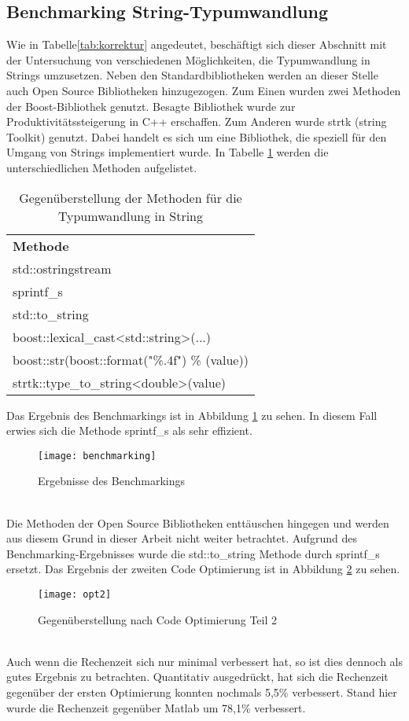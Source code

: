 \subsection{Benchmarking String-Typumwandlung}
Wie in Tabelle\ref{tab:korrektur} angedeutet, beschäftigt sich dieser Abschnitt mit der Untersuchung von verschiedenen Möglichkeiten, die Typumwandlung in Strings umzusetzen. Neben den Standardbibliotheken werden an dieser Stelle auch Open Source Bibliotheken hinzugezogen. Zum Einen wurden zwei Methoden der Boost-Bibliothek genutzt. Besagte Bibliothek wurde zur Produktivitätssteigerung in C++ erschaffen. Zum Anderen wurde strtk (string Toolkit) genutzt. Dabei handelt es sich um eine Bibliothek, die speziell für den Umgang von Strings implementiert wurde. In Tabelle \ref{tab:benchmarking} werden die unterschiedlichen Methoden aufgelistet. 
\begin{table}[h]
	\centering\begin{tabular}{l}
		\textbf{Methode}  \\
			std::ostringstream \\
			sprintf\_s \\
			std::to\_string\\
			boost::lexical\_cast<std::string>(...)\\
			boost::str(boost::format("\%.4f") \% (value))\\
			strtk::type\_to\_string<double>(value)
			\end{tabular}
	\caption{Gegenüberstellung der Methoden für die Typumwandlung in String}
\label{tab:benchmarking}
\end{table}\newpage
Das Ergebnis des Benchmarkings ist in Abbildung \ref{fig:benchmarking} zu sehen. In diesem Fall erwies sich die Methode sprintf\_s als sehr effizient.\\
\begin{figure}[h]
	\centering
	\texttt{[image: benchmarking]}
	\caption{Ergebnisse des Benchmarkings}
	\label{fig:benchmarking}
\end{figure}\noindent\\
 Die Methoden der Open Source Bibliotheken enttäuschen hingegen und werden aus diesem Grund in dieser Arbeit nicht weiter betrachtet. Aufgrund des Benchmarking-Ergebnisses wurde die std::to\_string Methode durch sprintf\_s ersetzt. Das Ergebnis der zweiten Code Optimierung ist in Abbildung \ref{fig:opt2} zu sehen.\\
\begin{figure}[h]
	\centering
	\texttt{[image: opt2]}
	\caption{Gegenüberstellung nach Code Optimierung Teil 2}
	\label{fig:opt2}
\end{figure}\noindent\\
Auch wenn die Rechenzeit sich nur minimal verbessert hat, so ist dies dennoch als gutes Ergebnis zu betrachten. Quantitativ ausgedrückt, hat sich die Rechenzeit gegenüber der ersten Optimierung konnten nochmals 5,5\% verbessert. Stand hier wurde die Rechenzeit gegenüber Matlab um 78,1\% verbessert.
